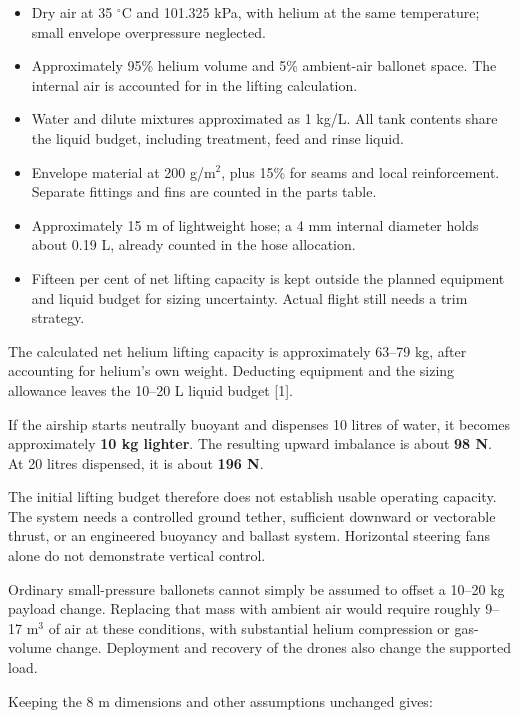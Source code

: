 \documentclass[11pt,letterpaper]{article}
\newcommand{\sectiontitle}[1]{\par\vspace{8pt}{\large\bfseries #1}\par\vspace{3pt}}
\begin{document}
\sectiontitle{Assumptions behind the calculation}
\begin{itemize}
\item Dry air at 35 $^\circ$C and 101.325 kPa, with helium at the same temperature; small envelope overpressure neglected.
\item Approximately 95\% helium volume and 5\% ambient-air ballonet space. The internal air is accounted for in the lifting calculation.
\item Water and dilute mixtures approximated as 1 kg/L. All tank contents share the liquid budget, including treatment, feed and rinse liquid.
\item Envelope material at 200 g/m$^2$, plus 15\% for seams and local reinforcement. Separate fittings and fins are counted in the parts table.
\item Approximately 15 m of lightweight hose; a 4 mm internal diameter holds about 0.19 L, already counted in the hose allocation.
\item Fifteen per cent of net lifting capacity is kept outside the planned equipment and liquid budget for sizing uncertainty. Actual flight still needs a trim strategy.
\end{itemize}

{\small The calculated net helium lifting capacity is approximately 63--79 kg, after accounting for helium's own weight. Deducting equipment and the sizing allowance leaves the 10--20 L liquid budget [1].}

\newpage
\sectiontitle{What happens as the tanks empty}
If the airship starts neutrally buoyant and dispenses 10 litres of water, it becomes approximately \textbf{10 kg lighter}. The resulting upward imbalance is about \textbf{98 N}. At 20 litres dispensed, it is about \textbf{196 N}.

The initial lifting budget therefore does not establish usable operating capacity. The system needs a controlled ground tether, sufficient downward or vectorable thrust, or an engineered buoyancy and ballast system. Horizontal steering fans alone do not demonstrate vertical control.

Ordinary small-pressure ballonets cannot simply be assumed to offset a 10--20 kg payload change. Replacing that mass with ambient air would require roughly 9--17 m$^3$ of air at these conditions, with substantial helium compression or gas-volume change. Deployment and recovery of the drones also change the supported load.

\sectiontitle{Sensitivity to envelope material}
Keeping the 8 m dimensions and other assumptions unchanged gives:
\end{document}

